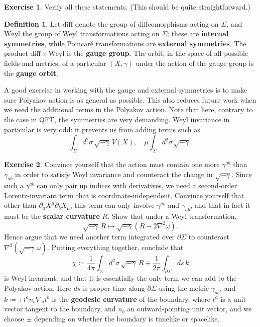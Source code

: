 \documentclass{report}
\theoremstyle{plain}
\theoremstyle{definition}
\newtheorem{definition}[theorem]{Definition}
\newtheorem{exercise}{Exercise}[section]
\theoremstyle{remark}
\newcommand{\di}{\partial}
\newcommand{\diff}{\mathrm{diff}}
\newcommand{\Weyl}{\mathrm{Weyl}}
\begin{document}
\begin{exercise}
  Verify all these statements. (This should be quite straightforward.)
\end{exercise}

\begin{definition}
  Let $\diff$ denote the group of diffeomorphisms acting on $\Sigma$,
  and $\Weyl$ the group of Weyl transformations acting on $\Sigma$;
  these are {\bf internal symmetries}, while Poincar\'e
  transformations are {\bf external symmetries}. The product $\diff
  \times \Weyl$ is the {\bf gauge group}. The orbit, in the space of
  all possible fields and metrics, of a particular $(X, \gamma)$ under
  the action of the gauge group is the {\bf gauge orbit}.
\end{definition}

A good exercise in working with the gauge and external symmetries is
to make sure Polyakov action is as general as possible. This also
reduces future work when we need the additional terms in the Polyakov
action. Note that here, contrary to the case in QFT, the symmetries
are very demanding. Weyl invariance in particular is very odd: it
prevents us from adding terms such as
\[ \int_\Sigma d^2\sigma \, \sqrt{-\gamma} \, V(X), \quad \mu \int_\Sigma d^2\sigma \, \sqrt{-\gamma}. \]

\begin{exercise}
  Convince yourself that the action must contain one more
  $\gamma^{ab}$ than $\gamma_{ab}$ in order to satisfy Weyl invariance
  and counteract the change in $\sqrt{-\gamma}$. Since such a
  $\gamma^{ab}$ can only pair up indices with derivatives, we need a
  second-order Lorentz-invariant term that is coordinate-independent.
  Convince yourself that other than $\di_a X^\mu \di_b X_\mu$, this
  term can only involve $\gamma^{ab}$ and $\gamma_{ab}$, and that in
  fact it must be the {\bf scalar curvature} $R$. Show that under a
  Weyl transformation,
  \[ \sqrt{-\gamma} \, R \mapsto \sqrt{-\gamma} (R - 2\nabla^2 \omega). \]
  Hence argue that we need another term integrated over $\di \Sigma$ to
  counteract $\nabla^2(\sqrt{-\gamma} \, \omega)$. Putting everything
  together, conclude that
  \[ \chi \coloneqq \frac{1}{4\pi} \int_\Sigma d^2\sigma \, \sqrt{-\gamma} \, R + \frac{1}{2\pi} \int_{\di \Sigma} ds \, k \]
  is Weyl invariant, and that it is essentially the only term we can
  add to the Polyakov action. Here $ds$ is proper time along $\di
  \Sigma$ using the metric $\gamma_{ab}$, and $k \coloneqq \pm t^a n_b
  \nabla_a t^b$ is the {\bf geodesic curvature} of the boundary, where
  $t^a$ is a unit vector tangent to the boundary, and $n_b$ an
  outward-pointing unit vector, and we choose $\pm$ depending on
  whether the boundary is timelike or spacelike.
\end{exercise}
\end{document}
